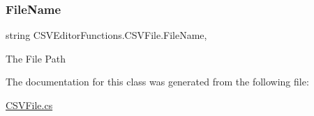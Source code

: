 \mbox{\label{class_c_s_v_editor_functions_1_1_c_s_v_file_ad692567c4f95f23945cf661da3d573c8}} 
\subsubsection{\texorpdfstring{FileName}{FileName}}
{\footnotesize\ttfamily string C\+S\+V\+Editor\+Functions.\+C\+S\+V\+File.\+File\+Name\hspace{0.3cm}{\ttfamily [get]}, {\ttfamily [set]}}



The File Path 



The documentation for this class was generated from the following file\+:\begin{DoxyCompactItemize}
\item 
\mbox{\hyperlink{_c_s_v_file_8cs}{C\+S\+V\+File.\+cs}}\end{DoxyCompactItemize}
